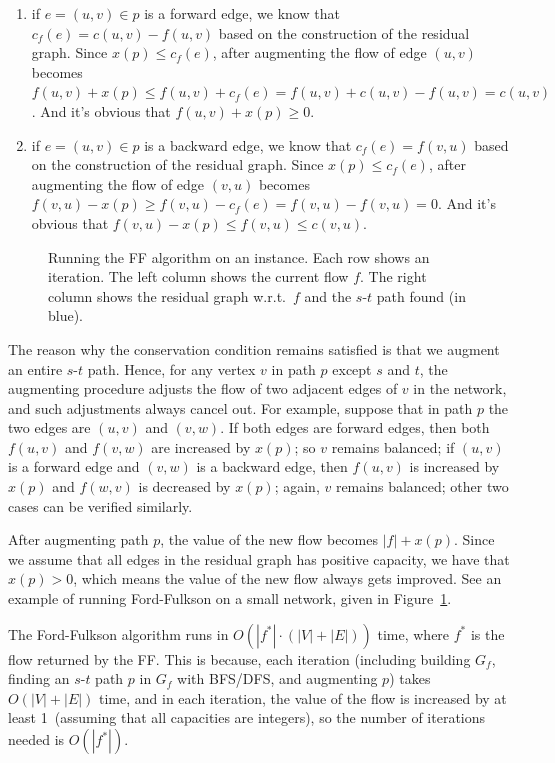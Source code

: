 \begin{enumerate}
\item if $e=(u,v)\in p$ is a forward edge, we know that $c_f(e)=c(u,v)-f(u,v)$ based on the
construction of the residual graph. Since $x( p) \le c_f (e)$, after augmenting the
flow of edge $(u, v)$ becomes $f(u, v) + x(p) \le f(u,v)+c_f (e) = f(u,v)+c(u,v)- f(u,v) = c(u,v)$. 
And it’s obvious that $f(u,v)+x(p) \ge 0$.
\item if $e=(u,v)\in p$ is a backward edge, we know that $c_f(e)=f(v,u)$ based on the
construction of the residual graph. Since $x(p) \le c_f(e)$, after augmenting the
flow of edge $(v, u)$ becomes $f(v, u) - x(p) \ge f(v,u)-c_f (e) = f(v,u)-f(v,u) = 0$. 
And it’s obvious that $f(v,u)-x(p) \le f(v,u) \le c(v,u)$.
\end{enumerate}

\begin{figure}[!b]
\centering{}
\caption{Running the FF algorithm on an instance. Each row shows an iteration. The left column shows
the current flow $f$. The right column shows the residual graph w.r.t.\ $f$ and the $s$-$t$ path found (in blue).}
\label{fig:ff}
\end{figure}


The reason why the conservation condition remains satisfied is that we augment an entire $s$-$t$ path. Hence,
for any vertex $v$ in path $p$ except $s$ and $t$, the augmenting procedure adjusts the
flow of two adjacent edges of $v$ in the network, and such adjustments always
cancel out. For example, suppose that in path $p$ the two edges are $(u,v)$ and
$(v,w)$. If both edges are forward edges, then both $f(u,v)$ and $f(v,w)$ are
increased by $x(p)$; so $v$ remains balanced; if $(u, v)$ is a forward edge and $(v,
		w)$ is a backward edge, then $f (u, v)$ is increased by $x(p)$ and $f(w,v)$ is
decreased by $x(p)$; again, $v$ remains balanced; other two cases can be verified
similarly.

After augmenting path $p$, the value of the new flow becomes $|f|+x(p)$. Since we
assume that all edges in the residual graph has positive capacity, we have that
$x(p) > 0$, which means the value of the new flow always gets improved. 
See an example of running Ford-Fulkson on a small network, given in Figure~\ref{fig:ff}.


The Ford-Fulkson algorithm runs in $O(|f^*|\cdot(|V|+|E|))$ time,
where $f^*$ is the flow returned by the FF. 
This is because, each iteration (including building $G_f$, finding an $s$-$t$ path $p$ in $G_f$
with BFS/DFS, and augmenting $p$) takes $O(|V|+|E|)$ time, and in each iteration,
the value of the flow is increased by at least 1~(assuming that all capacities are integers),
so the number of iterations needed is $O(|f^*|)$.



